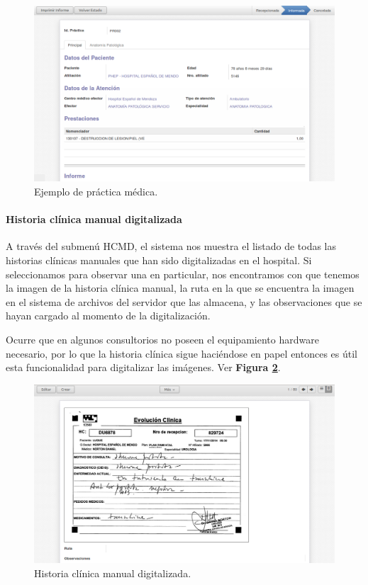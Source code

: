 \begin{figure}
      \centering
      \includegraphics[width=.8\textwidth]{img/tp1/HE/Practica1}
      \caption{Ejemplo de práctica médica.}
      \label{practica-medica}
\end{figure}


\paragraph{Historia clínica manual digitalizada}

A través del submenú HCMD, el sistema nos muestra el listado de todas las historias clínicas manuales que han sido digitalizadas en el hospital.
Si seleccionamos para observar una en particular, nos encontramos con que tenemos la imagen de la historia clínica manual, la ruta en la que se encuentra la imagen en el sistema de archivos del servidor que las almacena, y las observaciones que se hayan cargado al momento de la digitalización.

Ocurre que en algunos consultorios no poseen el equipamiento hardware necesario, por lo que la historia clínica sigue haciéndose en papel entonces es útil esta funcionalidad para digitalizar las imágenes. Ver \textbf{Figura \ref{HCMD}}.

\begin{figure}[ht]
      \centering
      \includegraphics[width=.8\textwidth]{img/tp1/HE/HCMDmanualdigital}
      \caption{Historia clínica manual digitalizada.}
      \label{HCMD}
\end{figure}


